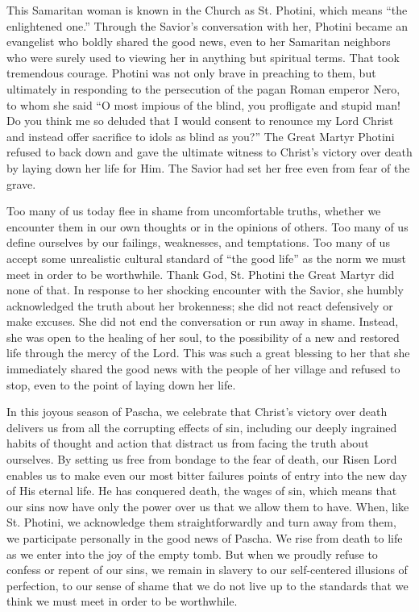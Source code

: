\documentclass[twoside, letterpaper, 12pt]{report}
\begin{document}
\begin{maybetwocolumns}
This Samaritan woman is known in the Church as St. Photini, which means “the enlightened one.”
Through the Savior’s conversation with her, Photini became an evangelist who boldly shared the
good news, even to her Samaritan neighbors who were surely used to viewing her in anything but
spiritual terms. That took tremendous courage. Photini was not only brave in preaching to them,
but ultimately in responding to the persecution of the pagan Roman emperor Nero, to whom she
said “O most impious of the blind, you profligate and stupid man! Do you think me so deluded
that I would consent to renounce my Lord Christ and instead offer sacrifice to idols as blind as
you?” The Great Martyr Photini refused to back down and gave the ultimate witness to Christ’s
victory over death by laying down her life for Him. The Savior had set her free even from fear of
the grave.

Too many of us today flee in shame from uncomfortable truths, whether we encounter them in our
own thoughts or in the opinions of others. Too many of us define ourselves by our failings,
weaknesses, and temptations. Too many of us accept some unrealistic cultural standard of “the
good life” as the norm we must meet in order to be worthwhile. Thank God, St. Photini the Great
Martyr did none of that. In response to her shocking encounter with the Savior, she humbly
acknowledged the truth about her brokenness; she did not react defensively or make excuses. She
did not end the conversation or run away in shame. Instead, she was open to the healing of her
soul, to the possibility of a new and restored life through the mercy of the Lord. This was such a
great blessing to her that she immediately shared the good news with the people of her village and
refused to stop, even to the point of laying down her life.

In this joyous season of Pascha, we celebrate that Christ’s victory over death delivers us from all
the corrupting effects of sin, including our deeply ingrained habits of thought and action that
distract us from facing the truth about ourselves. By setting us free from bondage to the fear of
death, our Risen Lord enables us to make even our most bitter failures points of entry into the new
day of His eternal life. He has conquered death, the wages of sin, which means that our sins now
have only the power over us that we allow them to have. When, like St. Photini, we acknowledge
them straightforwardly and turn away from them, we participate personally in the good news of
Pascha. We rise from death to life as we enter into the joy of the empty tomb. But when we
proudly refuse to confess or repent of our sins, we remain in slavery to our self-centered illusions
of perfection, to our sense of shame that we do not live up to the standards that we think we must
meet in order to be worthwhile.


\end{maybetwocolumns}
\end{document}
